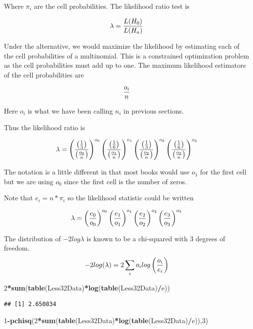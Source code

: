 \documentclass[]{book}
\newenvironment{Shaded}{\begin{snugshade}}{\end{snugshade}}
\newcommand{\KeywordTok}[1]{\textcolor[rgb]{0.13,0.29,0.53}{\textbf{#1}}}
\newcommand{\DecValTok}[1]{\textcolor[rgb]{0.00,0.00,0.81}{#1}}
\newcommand{\OperatorTok}[1]{\textcolor[rgb]{0.81,0.36,0.00}{\textbf{#1}}}
\newcommand{\NormalTok}[1]{#1}
\theoremstyle{definition}
\theoremstyle{definition}
\theoremstyle{definition}
\theoremstyle{remark}
\begin{document}
Where \(\pi_{i}\) are the cell probabilities. The likelihood ratio test
is

\[\lambda = {L(H_{0}) \over L(H_{a})}\]

Under the alternative, we would maximize the likelihood by estimating
each of the cell probabilities of a multinomial. This is a constrained
optimization problem as the cell probabilities must add up to one. The
maximum likelihood estimators of the cell probabilities are

\[{o_{i} \over n}\]

Here \(o_{i}\) is what we have been calling \(n_{i}\) in previous
sections.

Thus the likelihood ratio is

\[\lambda =\left( {\left( {1 \over 3} \right)  \over \left( {o_{0} \over n}\right) } \right)^{o_{0}}\left( {\left( {1 \over 6} \right)  \over \left( {o_{1} \over n}\right) } \right)^{o_{1}} \left( {\left( {1 \over 3} \right)  \over \left( {o_{2} \over n}\right) } \right)^{o_{2}}\left( {\left( {1 \over 6} \right)  \over \left( {o_{3} \over n}\right) } \right)^{o_{3}}\]

The notation is a little different in that most books would use
\(o_{1}\) for the first cell but we are using \(o_{0}\) since the first
cell is the number of zeros.

Note that \(e_{i}=n*\pi_{i}\) so the likelihood statistic could be
written

\[\lambda =\left( { e_{0}  \over o_{0}} \right)^{o_{0}}\left( { e_{1}  \over o_{1}} \right)^{o_{1}}\left( { e_{2}  \over o_{2}} \right)^{o_{2}}\left( { e_{3}  \over o_{3}} \right)^{o_{3}}\]

The distribution of \(-2log \lambda\) is known to be a chi-squared with
3 degrees of freedom.
\[-2log(\lambda)=2 \sum_{i}o_{i}log \left({ o_{i}  \over e_{i}} \right) \]

\begin{Shaded}
\begin{Highlighting}[]
\DecValTok{2}\OperatorTok{*}\KeywordTok{sum}\NormalTok{(}\KeywordTok{table}\NormalTok{(Less32Data)}\OperatorTok{*}\KeywordTok{log}\NormalTok{(}\KeywordTok{table}\NormalTok{(Less32Data)}\OperatorTok{/}\NormalTok{e))}
\end{Highlighting}
\end{Shaded}

\begin{verbatim}
## [1] 2.650834
\end{verbatim}

\begin{Shaded}
\begin{Highlighting}[]
\DecValTok{1}\OperatorTok{-}\KeywordTok{pchisq}\NormalTok{(}\DecValTok{2}\OperatorTok{*}\KeywordTok{sum}\NormalTok{(}\KeywordTok{table}\NormalTok{(Less32Data)}\OperatorTok{*}\KeywordTok{log}\NormalTok{(}\KeywordTok{table}\NormalTok{(Less32Data)}\OperatorTok{/}\NormalTok{e)),}\DecValTok{3}\NormalTok{)}
\end{Highlighting}
\end{Shaded}
\end{document}
